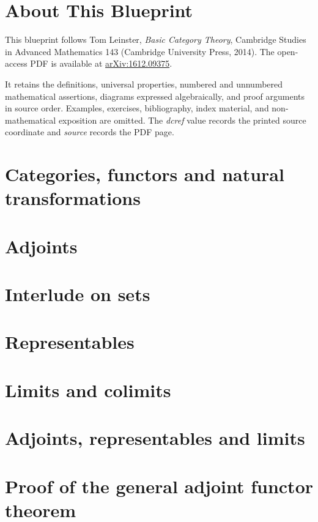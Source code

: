 
\chapter*{About This Blueprint}
This blueprint follows Tom Leinster, \emph{Basic Category Theory}, Cambridge
Studies in Advanced Mathematics 143 (Cambridge University Press, 2014).  The
open-access PDF is available at
\href{https://arxiv.org/pdf/1612.09375}{arXiv:1612.09375}.

It retains the definitions, universal properties, numbered and unnumbered
mathematical assertions, diagrams expressed algebraically, and proof arguments
in source order.  Examples, exercises, bibliography, index material, and
non-mathematical exposition are omitted.  The \emph{dcref} value records the
printed source coordinate and \emph{source} records the PDF page.
\chapter{Categories, functors and natural transformations}
\label{chap:lbc-categories}

\chapter{Adjoints}
\label{chap:lbc-adjoints}

\chapter{Interlude on sets}
\label{chap:lbc-sets}

\chapter{Representables}
\label{chap:lbc-representables}

\chapter{Limits and colimits}
\label{chap:lbc-limits}

\chapter{Adjoints, representables and limits}
\label{chap:lbc-applications}

\appendix
\chapter{Proof of the general adjoint functor theorem}
\label{app:lbc-gaft}

